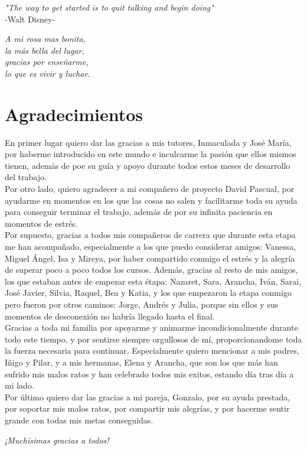 {
	\vspace*{1cm}
	\begin{flushright}
		\textit{"The way to get started is to quit talking and begin doing"}\\
		\vspace{10pt}
		-Walt Disney-
	\end{flushright}
	
	\vspace*{14cm}
	\begin{flushright}
		\textit{A mi rosa mas bonita,\\
		la más bella del lugar,\\
		gracias por enseñarme,\\
		lo que es vivir y luchar.}
	\end{flushright}
}

\chapter*{Agradecimientos}

En primer lugar quiero dar las gracias a mis tutores, Inmaculada y José María, por haberme introducido en este mundo e inculcarme la pasión que ellos mismos tienen, además de poe su guía y apoyo durante todos estos meses de desarrollo del trabajo.\\
 
Por otro lado, quiero agradecer a mi compañero de proyecto David Pascual, por ayudarme en momentos en los que las cosas no salen y facilitarme toda su ayuda para conseguir terminar el trabajo, además de por su infinita paciencia en momentos de estrés.\\

Por supuesto, gracias a todos mis compañeros de carrera que durante esta etapa me han acompañado, especialmente a los que puedo considerar amigos: Vanessa, Miguel Ángel, Isa y Mireya, por haber compartido conmigo el estrés y la alegría de superar poco a poco todos los cursos. Además, gracias al resto de mis amigos, los que estaban antes de empezar esta étapa: Nazaret, Sara, Arancha, Iván, Sarai, José Javier, Silvia, Raquel, Bea y Katia, y los que empezaron la etapa conmigo pero fueron por otros caminos: Jorge, Andrés y Julia, porque sin ellos y sus momentos de desconexión no habría llegado hasta el final.\\

Gracias a toda mi familia por apoyarme y animarme incondicionalmente durante todo este tiempo, y por sentirse siempre orgullosos de mí, proporcionandome toda la fuerza necesaria para continuar. Especialmente quiero mencionar a mis padres, Iñigo y Pilar, y a mis hermanas, Elena y Arancha, que son los que más han sufrido mis malos ratos y han celebrado todos mis exitos, estando día tras día a mi lado.\\

Por último quiero dar las gracias a mi pareja, Gonzalo, por su ayuda prestada, por soportar mis malos ratos, por compartir mis alegrías, y por hacerme sentir grande con todas mis metas conseguidas.\\

\begin{flushright}
	\emph{¡Muchí­simas gracias a todos!}
\end{flushright}
